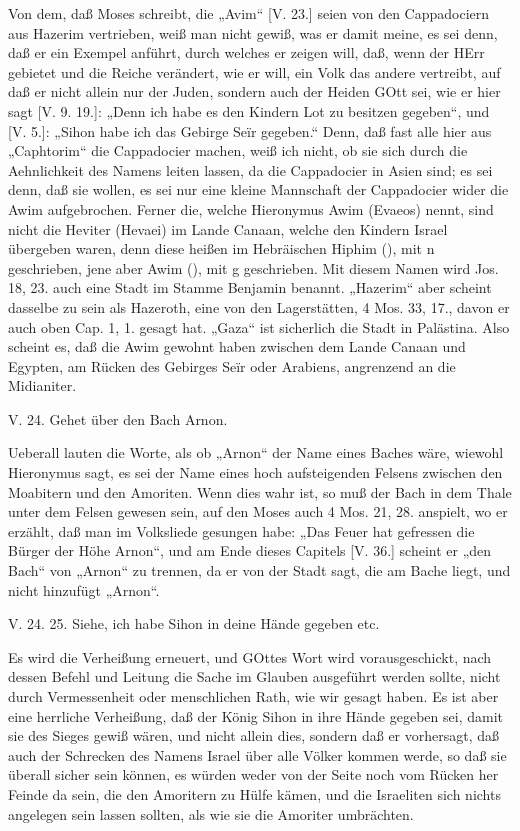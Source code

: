 Von dem, daß Moses schreibt, die „Avim“ [V. 23.] seien von den Cappadociern aus Hazerim vertrieben, weiß man nicht gewiß, was er
damit meine, es sei denn, daß er ein Exempel anführt, durch welches er zeigen will, daß, wenn der HErr gebietet und die Reiche verändert, wie er will, ein Volk das andere vertreibt, auf daß er nicht allein nur der Juden, sondern auch der Heiden GOtt sei, wie er hier sagt [V. 9. 19.]: „Denn ich habe es den Kindern Lot zu besitzen gegeben“, und [V. 5.]: „Sihon habe ich das Gebirge Seïr gegeben.“ Denn, daß fast alle hier aus „Caphtorim“ die Cappadocier machen, weiß ich nicht, ob sie sich durch die Aehnlichkeit des Namens leiten lassen, da die Cappadocier in Asien sind; es sei denn, daß sie wollen, es sei nur eine kleine Mannschaft der Cappadocier wider die Awim aufgebrochen. Ferner die, welche Hieronymus Awim (Evaeos) nennt, sind nicht die Heviter (Hevaei) im Lande Canaan, welche den Kindern Israel übergeben waren, denn diese heißen im Hebräischen Hiphim (), mit n geschrieben, jene aber Awim (), mit g geschrieben. Mit diesem Namen wird Jos. 18, 23. auch eine Stadt im Stamme Benjamin benannt. „Hazerim“ aber scheint dasselbe zu sein als Hazeroth, eine von den Lagerstätten, 4 Mos. 33, 17., davon er auch oben Cap. 1, 1. gesagt hat. „Gaza“ ist sicherlich die Stadt in Palästina. Also scheint es, daß die Awim gewohnt haben zwischen dem Lande Canaan und Egypten, am Rücken des Gebirges Seïr oder Arabiens, angrenzend an die Midianiter.

\begin{schriftzitat}
V. 24. Gehet über den Bach Arnon.
\end{schriftzitat}

Ueberall lauten die Worte, als ob „Arnon“ der Name eines Baches wäre, wiewohl Hieronymus sagt, es sei der Name eines hoch aufsteigenden Felsens zwischen den Moabitern und den Amoriten. Wenn dies wahr ist, so muß der Bach in dem Thale unter dem Felsen gewesen sein, auf den Moses auch 4 Mos. 21, 28. anspielt, wo er erzählt, daß man im Volksliede gesungen habe: „Das Feuer hat gefressen die Bürger der Höhe Arnon“, und am Ende dieses Capitels [V. 36.] scheint er „den Bach“ von „Arnon“ zu trennen, da er von der Stadt sagt, die am Bache liegt, und nicht hinzufügt „Arnon“.

\begin{schriftzitat}
V. 24. 25. Siehe, ich habe Sihon in deine Hände gegeben etc.
\end{schriftzitat}

Es wird die Verheißung erneuert, und GOttes Wort wird vorausgeschickt, nach dessen Befehl und Leitung die Sache im Glauben ausgeführt werden sollte, nicht durch Vermessenheit oder menschlichen Rath, wie wir gesagt haben. Es ist aber eine herrliche Verheißung, daß der König Sihon in ihre Hände gegeben sei, damit sie des Sieges gewiß wären, und nicht allein dies, sondern daß er vorhersagt, daß auch der Schrecken des Namens Israel über alle Völker kommen werde, so daß sie überall sicher sein können, es würden weder von der Seite noch vom Rücken her Feinde da sein, die den Amoritern zu Hülfe kämen, und die Israeliten sich nichts angelegen sein lassen sollten, als wie sie die Amoriter umbrächten.

